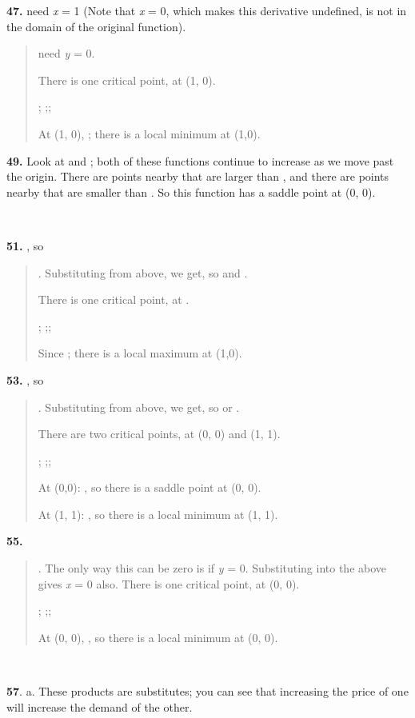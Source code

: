 \textbf{47.} need \emph{x} = 1 (Note that \emph{x} = 0, which makes this
derivative undefined, is not in the domain of the original function).

\begin{quote}
need \emph{y} = 0.

There is one critical point, at (1, 0).

; ;;

At (1, 0), ; there is a local minimum at (1,0).
\end{quote}

\textbf{49.} Look at and ; both of these functions continue to increase
as we move past the origin. There are points nearby that are larger than
, and there are points nearby that are smaller than . So this function
has a saddle point at (0, 0).

\textbf{\\
}

\textbf{51.} , so

\begin{quote}
. Substituting from above, we get, so and .

There is one critical point, at .

; ;;

Since ; there is a local maximum at (1,0).
\end{quote}

\textbf{53.} , so

\begin{quote}
. Substituting from above, we get, so or .

There are two critical points, at (0, 0) and (1, 1).

; ;;

At (0,0): , so there is a saddle point at (0, 0).

At (1, 1): , so there is a local minimum at (1, 1).
\end{quote}

\textbf{55.}

\begin{quote}
. The only way this can be zero is if \emph{y} = 0. Substituting into
the above gives \emph{x} = 0 also. There is one critical point, at (0,
0).

; ;;

At (0, 0), , so there is a local minimum at (0, 0).
\end{quote}

\textbf{\\
}

\textbf{57}. a. These products are substitutes; you can see that
increasing the price of one will increase the demand of the other.

